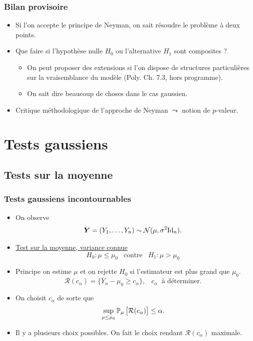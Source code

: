 \begin{frame}
\frametitle{Bilan provisoire}
\begin{itemize}
\item Si l'on accepte \alert{le principe de Neyman}, on sait résoudre le problème à deux points.
\item Que faire si l'hypothèse nulle $H_0$ ou l'alternative $H_1$ sont \alert{composites} ?
\begin{itemize}
\item On peut proposer des extensions si l'on dispose de structures particulières sur la vraisemblance du modèle (Poly. Ch. 7.3, hors programme).
\item On sait dire \alert{ beaucoup de choses} dans le cas gaussien.
\end{itemize}
\item \alert{ Critique méthodologique de l'approche de Neyman} $\leadsto$ notion de $p$-valeur.
\end{itemize}
\end{frame}





\section{Tests gaussiens}

\subsection{Tests sur la moyenne}

\begin{frame}
\frametitle{Tests gaussiens incontournables}
\begin{itemize}
\item On observe
$$\operatorname{\boldsymbol{Y}}=(Y_1,\ldots, Y_n) \sim {\mathcal N}(\mu, \sigma^2 \text{Id}_n).$$
\item \underline{\alert{Test sur la moyenne, variance connue}}
$$H_0:\mu \leq \mu_0\;\;\;\text{contre}\;\;\;H_1:\mu > \mu_0$$
\item \alert{ Principe} on estime $\mu$ et on rejette $H_0$ si l'estimateur est  plus grand  que $\mu_0$.
$${\mathcal R}(c_\alpha) = \big\{\overline{Y}_n - \mu_0 \geq c_\alpha\big\},\;\;\;c_\alpha\;\;\text{à déterminer}.$$
\item On choisit $c_\alpha$ de sorte que
$$\sup_{\mu \leq \mu_0}\operatorname{{\mathbb P}}_\mu\big[{\mathcal R}(c_\alpha)\big] \leq \alpha.$$
\item Il y a \alert{plusieurs choix possibles}. On fait le choix rendant  ${\mathcal R}(c_\alpha)$ \alert{  maximale}.
\end{itemize}
\end{frame}

